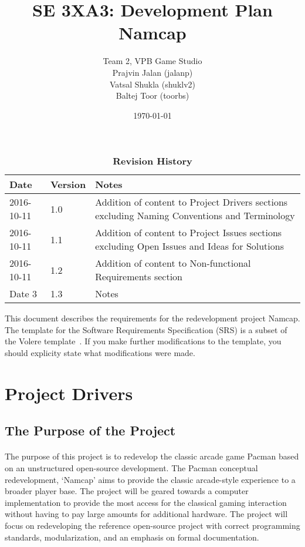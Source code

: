 \documentclass[12pt, titlepage]{article}
\title{SE 3XA3: Development Plan\\Namcap}
\author{Team 2, VPB Game Studio
		\\ Prajvin Jalan (jalanp)
		\\ Vatsal Shukla (shuklv2)
		\\ Baltej Toor (toorbs)
}
\date{\today}
\begin{document}
\maketitle

\tableofcontents
\listoftables
\listoffigures

\begin{table}[bp]
\caption{\bf Revision History}
\begin{tabularx}{\textwidth}{p{3cm}p{2cm}X}
\toprule {\bf Date} & {\bf Version} & {\bf Notes}\\
\midrule
2016-10-11 & 1.0 & Addition of content to Project Drivers sections excluding Naming Conventions and Terminology\\
2016-10-11 & 1.1 & Addition of content to Project Issues sections excluding Open Issues and Ideas for Solutions\\
2016-10-11 & 1.2 & Addition of content to Non-functional Requirements section\\
Date 3 & 1.3 & Notes\\
\bottomrule
\end{tabularx}
\end{table}

\newpage


This document describes the requirements for the redevelopment project Namcap.  The template for the Software
Requirements Specification (SRS) is a subset of the Volere
template~\citep{RobertsonAndRobertson2012}.  If you make further modifications
to the template, you should explicity state what modifications were made.

\section{Project Drivers}

\subsection{The Purpose of the Project}
\paragraph{}
The purpose of this project is to redevelop the classic arcade game Pacman based on an unstructured open-source development. The Pacman conceptual redevelopment, ‘Namcap’ aims to provide the classic arcade-style experience to a broader player base. The project will be geared towards a computer implementation to provide the most access for the classical gaming interaction without having to pay large amounts for additional hardware. The project will focus on redeveloping the reference open-source project with correct programming standards, modularization, and an emphasis on formal documentation.
\end{document}
